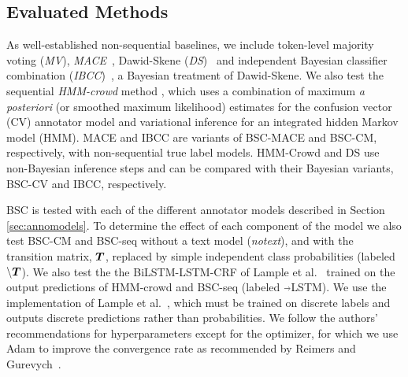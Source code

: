 
\subsection{Evaluated Methods}
As well-established non-sequential baselines, we include token-level majority voting (\emph{MV}), \emph{MACE}~\cite{hovy2013learning}, Dawid-Skene (\emph{DS})~\cite{dawid_maximum_1979} and independent Bayesian classifier combination (\emph{IBCC})~\cite{kim2012bayesian}, a Bayesian treatment of Dawid-Skene. 
We also test the sequential \emph{HMM-crowd} method \cite{nguyen2017aggregating}, which uses a combination of 
maximum \emph{a posteriori} (or smoothed maximum likelihood) estimates for the confusion vector (CV) annotator model 
and variational inference for an integrated hidden Markov model (HMM). 
MACE and IBCC are variants of BSC-MACE and BSC-CM, respectively, with non-sequential true label models.
HMM-Crowd and DS use non-Bayesian inference steps and can be compared with
their Bayesian variants, BSC-CV and IBCC, respectively. 

BSC is tested with each of the different annotator models described in Section \ref{sec:annomodels}.
To determine the effect of each component of the model we also test BSC-CM 
and BSC-seq without a text model (\emph{notext}), 
and with the transition matrix, $\boldsymbol T$, replaced by simple independent class probabilities (labeled $\backslash \boldsymbol T$).
We also test the the BiLSTM-LSTM-CRF of Lample et al.~ 
trained on the output predictions of HMM-crowd and BSC-seq (labeled $\Arrow{0.2cm}$LSTM).
We use the implementation of Lample et al.~, which
must be trained on discrete labels and outputs discrete predictions rather than probabilities.
We follow the authors' recommendations for hyperparameters except for the optimizer, 
for which we use Adam to improve the convergence rate as recommended by Reimers and Gurevych~.

